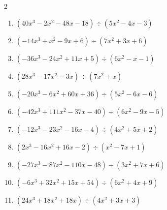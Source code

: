 \begin{multicols}{2}
\begin{enumerate}
        \phantom{$商 : -6x+1, \quad 剰余 : -6$}

  \item $(40x^{3}-2x^{2}-48x-18) \div (5x^{2}-4x-3)$

        \phantom{$商 : 8x+6, \quad 剰余 : -4x+9$}

  \item $(-14x^{3}+x^{2}-9x+6) \div (7x^{2}+3x+6)$

        \phantom{$商 : -2x+1, \quad 剰余 : -9x-3$}

  \item $(-36x^{3}-24x^{2}+11x+5) \div (6x^{2}-x-1)$

        \phantom{$商 : -6x-5, \quad 剰余 : -5$}

  \item $(28x^{3}-17x^{2}-3x) \div (7x^{2}+x)$

        \phantom{$商 : 4x-3, \quad 剰余 : 8x-1$}

\columnbreak %

\resetques

  \item $(-20x^{3}-6x^{2}+60x+36) \div (5x^{2}-6x-6)$

        \phantom{$商 : -4x-6, \quad 剰余 : -3x-6$}

  \item $(-42x^{3}+111x^{2}-37x-40) \div (6x^{2}-9x-5)$

        \phantom{$商 : -7x+8, \quad 剰余 : -7x-3$}

  \item $(-12x^{3}-23x^{2}-16x-4) \div (4x^{2}+5x+2)$

        \phantom{$商 : -3x-2, \quad 剰余 : 5x-3$}

  \item $(2x^{3}-16x^{2}+16x-2) \div (x^{2}-7x+1)$

        \phantom{$商 : 2x-2, \quad 剰余 : -5x-8$}

  \item $(-27x^{3}-87x^{2}-110x-48) \div (3x^{2}+7x+6)$

        \phantom{$商 : -9x-8, \quad 剰余 : 2$}

\columnbreak %

  \item $(-6x^{3}+32x^{2}+15x+54) \div (6x^{2}+4x+9)$

        \phantom{$商 : -x+6, \quad 剰余 : -5x-3$}

  \item $(24x^{3}+18x^{2}+18x) \div (4x^{2}+3x+3)$


\end{enumerate}
\end{multicols}
